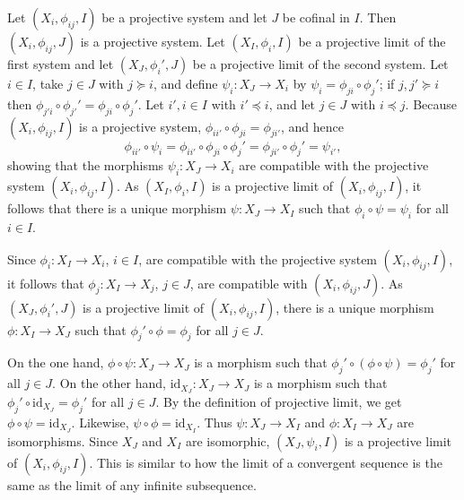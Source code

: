 \documentclass{article}
\newcommand{\id}{\textrm{id}}
\begin{document}
Let $(X_i,\phi_{ij},I)$ be a projective system and let $J$ be cofinal in $I$. Then $(X_i,\phi_{ij},J)$ is a projective system. Let $(X_I,\phi_i,I)$ be a projective limit of
the first system and let $(X_J,\phi_i',J)$ be a projective limit of the second system. Let $i \in I$,  take $j \in J$ with $j \succeq i$, and define $\psi_i:X_J \to X_i$ by 
$\psi_i=\phi_{ji} \circ \phi_j'$; if $j,j' \succeq i$ then $\phi_{j'i} \circ \phi_{j'}'=\phi_{ji} \circ \phi_j'$. Let $i',i \in I$ with $i' \preceq i$, and let $j \in J$ with $i \preceq j$. 
Because $(X_i,\phi_{ij},I)$ is  a projective system, $\phi_{ii'} \circ\phi_{ji}=\phi_{ji'}$, and hence
\[
\phi_{ii'} \circ \psi_i=\phi_{ii'} \circ \phi_{ji} \circ \phi_j'=\phi_{ji'} \circ\phi_j'=\psi_{i'},
\]
showing that the morphisms $\psi_i:X_J \to X_i$ are compatible with the projective
system $(X_i,\phi_{ij},I)$. As $(X_I,\phi_i,I)$ is a projective limit of
 $(X_i,\phi_{ij},I)$,
it follows that there is a unique morphism $\psi:X_J \to X_I$
such that $\phi_i \circ \psi= \psi_i$ for all $i \in I$.

Since $\phi_i:X_I \to X_i$, $i \in I$, are compatible with the projective system
$(X_i,\phi_{ij},I)$, it follows that $\phi_j:X_I \to X_j$, $j \in J$, are compatible
with $(X_i,\phi_{ij},J)$. As $(X_J,\phi_i',J)$ is a projective limit of $(X_i,\phi_{ij},I)$, 
there is a unique morphism $\phi:X_I \to X_J$ such that $\phi_j' \circ \phi = \phi_j$ for all $j \in J$. 

On the one hand,
$\phi \circ \psi: X_J \to X_J$ is a morphism such that $\phi_j' \circ (\phi \circ \psi) = \phi_j'$ for all $j \in J$. On the other hand,
$\id_{X_J}:X_J \to X_J$ is a morphism such that $\phi_j' \circ \id_{X_J} = \phi_j'$ for all $j \in J$. By the definition of projective limit, we get
$\phi \circ \psi=\id_{X_J}$. Likewise, $\psi \circ \phi = \id_{X_I}$. Thus $\psi:X_J \to X_I$ and $\phi:X_I \to X_J$ are  isomorphisms.
Since $X_J$ and $X_I$ are isomorphic, 
$(X_J,\psi_i,I)$
is a projective limit of $(X_i,\phi_{ij},I)$. This is similar to how the limit of a convergent sequence is the same as the limit of any infinite subsequence.
\end{document}
